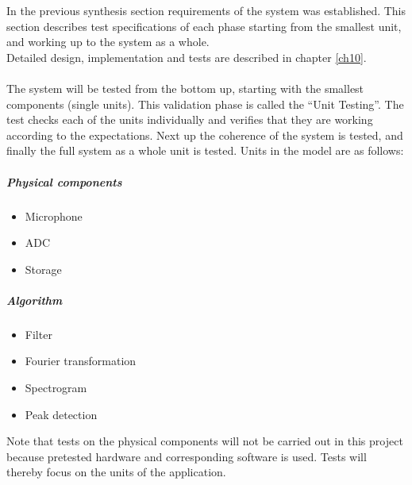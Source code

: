 In the previous synthesis section requirements of the system was established. This section describes test specifications of each phase starting from the smallest unit, and working up to the system as a whole. \\
Detailed design, implementation and tests are described in chapter \ref{ch10}. \\
\\
The system will be tested from the bottom up, starting with the smallest components (single units). This validation phase is called the ``Unit Testing''. The test checks each of the units individually and verifies that they are working according to the expectations. Next up the coherence of the system is tested, and finally the full system as a whole unit is tested. Units in the model are as follows:
\begin{multicols}{2}
\subparagraph{Physical components}  
\begin{itemize}
	\item Microphone
	\item ADC
	\item Storage
\end{itemize}
\columnbreak
\subparagraph{Algorithm}
\begin{itemize}
	\item Filter
	\item Fourier transformation
	\item Spectrogram
	\item Peak detection
\end{itemize}
\end{multicols}
Note that tests on the physical components will not be carried out in this project because pretested hardware and corresponding software is used. Tests will thereby focus on the units of the application.
 
